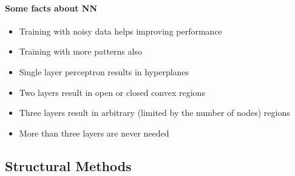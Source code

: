 \paragraph{Some facts about NN}
\begin{itemize}
\item Training with noisy data helps improving performance
\item Training with more patterns also
\item Single layer perceptron results in hyperplanes
\item Two layers result in open or closed convex regions
\item Three layers result in arbitrary (limited by the number of nodes) regions
\item More than three layers are never needed
\end{itemize}

\subsection{Structural Methods}


